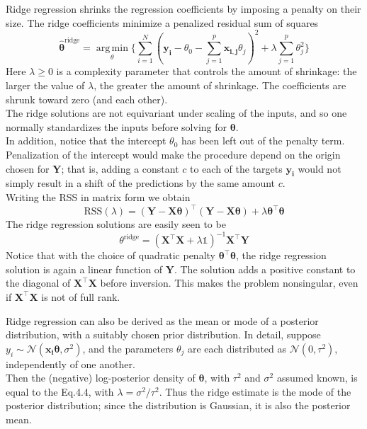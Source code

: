 \documentclass[twoside]{article}
\DeclareMathOperator*{\argmin}{arg\,min}
\begin{document}
Ridge regression shrinks the regression coefficients by imposing a penalty on their size. The ridge coefficients minimize a penalized residual sum of squares
\begin{equation*}
    \hat{\boldsymbol{\theta}}^\text{ridge} = \argmin\limits_\theta\{\sum\limits_{i = 1}^{N}(\boldsymbol{y_i} - \theta_0 - \sum\limits_{j = 1}^{p}\boldsymbol{x_{i, j}}\theta_j)^2 + \lambda\sum\limits_{j = 1}^{p}\theta_j^2\}
\end{equation*}
Here $\lambda \geq 0$ is a complexity parameter that controls the amount of shrinkage: the larger the value of $\lambda$, the greater the amount of shrinkage. The coefficients are shrunk toward zero (and each other).\\
The ridge solutions are not equivariant under scaling of the inputs, and so one normally standardizes the inputs before solving for $\boldsymbol{\theta}$.\\
In addition, notice that the intercept $\theta_0$ has been left out of the penalty term. Penalization of the intercept would make the procedure depend on the origin
chosen for $\boldsymbol{Y}$; that is, adding a constant $c$ to each of the targets $\boldsymbol{y_i}$ would
not simply result in a shift of the predictions by the same amount $c$. \\
Writing the RSS in matrix form we obtain
\begin{equation*}
    \text{RSS}(\lambda) = (\boldsymbol{Y} - \boldsymbol{X\theta})^\intercal(\boldsymbol{Y} - \boldsymbol{X\theta}) + \lambda\boldsymbol{\theta}^\intercal\boldsymbol{\theta}
\end{equation*}
The ridge regression solutions are easily seen to be
\begin{equation}
    \theta^{\text{ridge}} = (\boldsymbol{X^\intercal{X}} + \lambda\mathds{1})^{-1}\boldsymbol{X}^\intercal\boldsymbol{Y}
\end{equation}
Notice that with the choice of quadratic penalty $\boldsymbol{\theta^\intercal\theta}$, the ridge regression solution is again a linear function of $\boldsymbol{Y}$. The solution adds a positive constant to the diagonal of $\boldsymbol{X^\intercal{X}}$ before inversion. This makes the problem nonsingular, even if $\boldsymbol{X^\intercal{X}}$ is not of full rank.\medskip

Ridge regression can also be derived as the mean or mode of a posterior distribution, with a suitably chosen prior distribution. In detail, suppose $y_i \sim \mathcal{N}(\boldsymbol{x_i\theta}, \sigma^2)$, and the parameters $\theta_j$ are each distributed as $\mathcal{N}(0, \tau^2)$, independently of one another.\\ Then the (negative) log-posterior density of $\boldsymbol{\theta}$, with $\tau^2$ and $\sigma^2$ assumed known, is equal to the Eq.4.4, with $\lambda = \sigma^2 / \tau^2$. Thus the ridge estimate is the mode of the posterior distribution; since the distribution is Gaussian, it is also the posterior mean.\medskip
\end{document}
